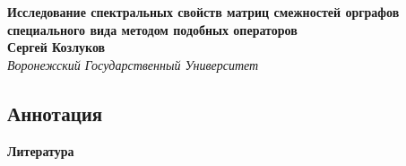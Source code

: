 \documentclass[12pt]{article}
\begin{document}
 

\begin{center}
    \textbf{Исследование спектральных свойств матриц
смежностей орграфов специального вида
методом подобных операторов}\\[3mm]
    \textbf{Сергей Козлуков}\\[2mm]
    \emph{Воронежский Государственный Университет}\\[2mm]
\end{center}

\subsection*{Аннотация}




\smallskip\centerline{\bf Литература} 
\begingroup
    \renewcommand{\section}[2]{}%
\endgroup
\end{document}
